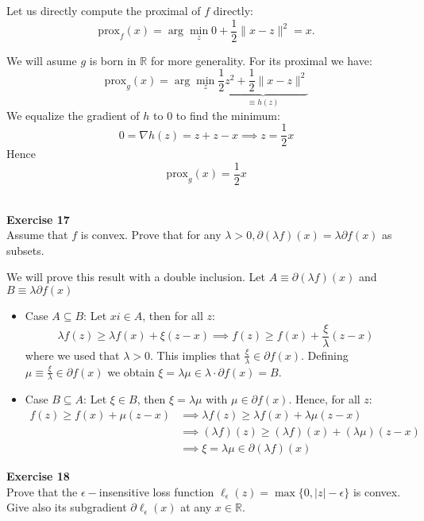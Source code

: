 \documentclass[11pt,table]{article}
\newenvironment{problem}[2][Exercise]
{ \begin{mdframed}[backgroundcolor=gray!20] \textbf{#1 #2} \\}
	{  \end{mdframed}}
\newcommand\abs[1]{\lvert#1\rvert}
\newcommand\R{\mathbb R}
\begin{document}
Let us directly compute the proximal of $f$ directly:
\[
	\text{prox}_f(x) = \arg \min_z 0 + \frac{1}{2} \parallel x - z \parallel^2 = x.
\]

We will asume $g$ is born in $\R$ for more generality. For its proximal we have:
\[
	\text{prox}_g(x) = \arg \min_z \underbrace{\frac{1}{2}z^2 + \frac{1}{2} \parallel x - z \parallel^2}_{\equiv h(z)}
\]
We equalize the gradient of $h$ to $0$ to find the minimum:
\[
	0 = \nabla h(z) = z + z - x \implies z = \frac{1}{2}x
\]
Hence
\[
	\text{prox}_g(x) =  \frac{1}{2} x
\] \\

\begin{problem}{17}
Assume that \( f \)  is convex. Prove that for any \( \lambda > 0, \partial(\lambda f)(x) = \lambda \partial f(x) \) as subsets.
\end{problem}

We will prove this result with a double inclusion. Let $A \equiv \partial(\lambda f)(x)$ and $B \equiv \lambda \partial f(x)$

\begin{itemize}
	\item Case $A \subseteq B$: Let $xi \in A$, then for all $z$:
	      \[
		      \lambda f(z) \ge \lambda f(x) + \xi (z-x) \implies f(z) \ge f(x) + \frac{\xi}{\lambda}(z-x)
	      \]
	      where we used that $\lambda > 0$. This implies that $\frac{\xi}{\lambda} \in \partial f(x)$. Defining $\mu \equiv \frac{\xi}{\lambda} \in \partial f(x)$ we obtain $\xi = \lambda \mu \in \lambda \cdot \partial f(x) = B$.

	\item Case $B \subseteq A$: Let $\xi \in B$, then $\xi = \lambda \mu$ with $\mu \in \partial f(x)$. Hence, for all $z$:
	      \begin{align*}
		      f(z) \ge f(x) + \mu(z-x) & \implies \lambda f(z) \ge \lambda f(x) + \lambda\mu(z-x)       \\
		                               & \implies (\lambda f)(z) \ge (\lambda f)(x) + (\lambda\mu)(z-x) \\
		                               & \implies \xi = \lambda \mu \in \partial(\lambda f)(x)
	      \end{align*}
\end{itemize}

\begin{problem}{18}
Prove that the \(\epsilon-\)insensitive loss function \(\ell_\epsilon(z) = \max\{0,\abs{z} - \epsilon\}\) is convex. Give also its subgradient \(\partial \ell_\epsilon(x)\) at any \(x \in \R\).
\end{problem}
\end{document}
